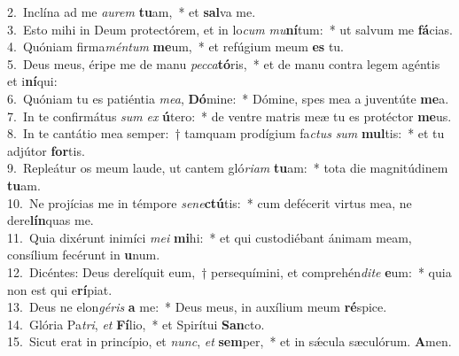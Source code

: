 {2.~}Inclína ad me \textit{au}\textit{rem} \textbf{tu}am,~* et \textbf{sal}va me.\\
{3.~}Esto mihi in Deum protectórem, et in lo\textit{cum} \textit{mu}\textbf{ní}tum:~* ut salvum me \textbf{fá}cias.\\
{4.~}Quóniam firma\textit{mén}\textit{tum} \textbf{me}um,~* et refúgium meum \textbf{es} tu.\\
{5.~}Deus meus, éripe me de manu \textit{pec}\textit{ca}\textbf{tó}ris,~* et de manu contra legem agéntis et i\textbf{ní}qui:\\
{6.~}Quóniam tu es patiéntia \textit{me}\textit{a}, \textbf{Dó}mine:~* Dómine, spes mea a juventúte \textbf{me}a.\\
{7.~}In te confirmátus \textit{sum} \textit{ex} \textbf{ú}tero:~* de ventre matris meæ tu es protéctor \textbf{me}us.\\
{8.~}In te cantátio mea semper:~† tamquam prodígium fa\textit{ctus} \textit{sum} \textbf{mul}tis:~* et tu adjútor \textbf{for}tis.\\
{9.~}Repleátur os meum laude, ut cantem gló\textit{ri}\textit{am} \textbf{tu}am:~* tota die magnitúdinem \textbf{tu}am.\\
{10.~}Ne projícias me in témpore \textit{se}\textit{ne}\textbf{ctú}tis:~* cum defécerit virtus mea, ne dere\textbf{lín}quas me.\\
{11.~}Quia dixérunt inimíci \textit{me}\textit{i} \textbf{mi}hi:~* et qui custodiébant ánimam meam, consílium fecérunt in \textbf{u}num.\\
{12.~}Dicéntes: Deus derelíquit eum,~† persequímini, et comprehén\textit{di}\textit{te} \textbf{e}um:~* quia non est qui e\textbf{rí}piat.\\
{13.~}Deus ne elon\textit{gé}\textit{ris} \textbf{a} me:~* Deus meus, in auxílium meum \textbf{ré}spice.\\
{14.~}Glória Pa\textit{tri}, \textit{et} \textbf{Fí}lio,~* et Spirítui \textbf{San}cto.\\
{15.~}Sicut erat in princípio, et \textit{nunc}, \textit{et} \textbf{sem}per,~* et in sǽcula sæculórum. \textbf{A}men.\\
